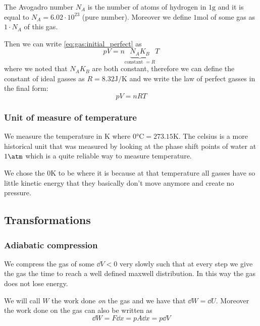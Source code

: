 \documentclass[12pt]{extarticle}
\begin{document}
The Avogadro number $N_A$ is the number of atoms of hydrogen in $1 \si{\gram}$ and it is equal to $N_A = 6.02 \cdot 10^{23}$ (pure number).
Moreover we define $1 \si{\mole}$ of some gas as $1 \cdot N_A$ of this gas.

Then we can write \autoref{eq:gas:initial_perfect} as
\begin{equation}
    pV = n \underbrace{N_A K_B}_{\text{constant } = R} T
\end{equation}
where we noted that $N_A K_B$ are both constant, therefore we can define the constant of ideal gasses as $R = 8.32 \si{\joule \per \kelvin}$ and we write the law of perfect gasses in the final form:
\begin{equation}
    \label{eq:gas:perfect}
    pV = nRT
\end{equation}

\subsubsection{Unit of measure of temperature}

We measure the temperature in $\si{\kelvin}$ where $0 \si{\celsius} = 273.15 \si{\kelvin}$.
The celsius is a more historical unit that was measured by looking at the phase shift points of water at $1 \si{\atm}$ which is a quite reliable way to measure temperature.

We chose the $0 \si{\kelvin}$ to be where it is because at that temperature all gasses have so little kinetic energy that they basically don't move anymore and create no pressure.

\subsection{Transformations}

\subsubsection{Adiabatic compression}

We compress the gas of some $\dd{V} < 0$ very slowly such that at every step we give the gas the time to reach a well defined maxwell distribution.
In this way the gas does not lose energy.

We will call $W$ the work done \emph{on} the gas and we have that $\dd{W} = \dd{U}$.
Moreover the work done on the gas can also be written as
\begin{equation}
    \dd{W} = F \dd{x} = p A \dd{x} = p \dd{V}
\end{equation}
\end{document}
